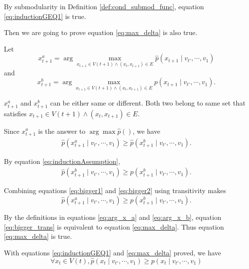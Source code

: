 \documentclass[12pt]{article}
\begin{document}
By submodularity in Definition \ref{def:cond_submod_func}, equation \eqref{eq:inductionGEQ1} is true.

Then we are going to prove equation \eqref{eq:max_delta} is also true.

Let 
\begin{equation}
\label{eq:arg_x_a}
x^{a}_{t+1} = \arg \max_{ x_{t+1} \in V(t+1) \land ( x_{t}, x_{t+1} ) \in E} \hat{p}( x_{t+1} \mid v_{t'} , \cdots , v_{1} )
\end{equation}
and 
\begin{equation}
\label{eq:arg_x_b}
x^{b}_{t+1} = \arg \max_{ x_{t+1} \in V(t+1) \land ( x_{t}, x_{t+1}) \in E } p( x_{t+1} \mid v_{t'} , \cdots , v_{1} ). 
\end{equation}

$ x^{a}_{t+1} $ and $ x^{b}_{t+1} $ can be either same or different. Both two belong to same set that satisfies $ x_{t+1} \in V(t+1) \land (x_{t}, x_{t+1}) \in E $.

Since $ x^{a}_{t+1} $ is the answer to $ \arg \max \hat{p}() $, we have
\begin{equation}
\label{eq:bigger1}
\begin{aligned}
\hat{p}( x^{a}_{t+1} \mid v_{t'} , \cdots , v_{1} ) \geq \hat{p}( x^{b}_{t+1} \mid v_{t'} , \cdots , v_{1} ).
\end{aligned}
\end{equation}


By equation \eqref{eq:inductionAssumption},
\begin{equation}
\label{eq:bigger2}
\begin{aligned}
\hat{p}( x^{b}_{t+1} \mid v_{t'} , \cdots , v_{1} ) \geq p( x^{b}_{t+1} \mid v_{t'} , \cdots , v_{1} ).
\end{aligned}
\end{equation}

Combining equations \eqref{eq:bigger1} and \eqref{eq:bigger2} using transitivity makes 
\begin{equation}
\label{eq:bigger_trans}
 \hat{p}( x^{a}_{t+1} \mid v_{t'} , \cdots , v_{1} ) \geq  p ( x^{b}_{t+1} \mid v_{t'} , \cdots , v_{1} ).
\end{equation} 

By the definitions in equations \eqref{eq:arg_x_a} and \eqref{eq:arg_x_b}, equation \eqref{eq:bigger_trans} is equivalent to equation \eqref{eq:max_delta}. Thus equation \eqref{eq:max_delta} is true.

With equations \eqref{eq:inductionGEQ1} and \eqref{eq:max_delta} proved, we have
\begin{equation}
\label{eq:inductConclusion}
\forall x_{t} \in V(t), \hat{p}( x_{t} \mid v_{t'} , \cdots , v_{1} ) \geq p( x_{t} \mid v_{t'} , \cdots , v_{1} )
\end{equation}
\end{document}
